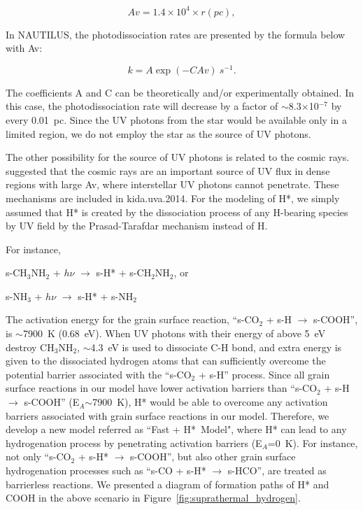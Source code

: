 \documentclass{aastex61}
\begin{document}
\begin{equation}
Av=1.4 \times 10^{4} \times r (pc),
\end{equation}


In NAUTILUS, the photodissociation rates are presented by the formula below with Av:

\begin{equation}
k = A\exp(-C Av)~s^{-1}.
\end{equation}

The coefficients A and C can be theoretically and/or experimentally obtained.
%
In this case, the photodissociation rate will decrease by a factor of $\sim$8.3$\times$10$^{-7}$ by every 0.01~pc.
%
Since the UV photons from the star would be available only in a limited region, we do not employ the star as the source of UV photons. 


The other possibility for the source of UV photons is related to the cosmic rays. 
%
\cite{Prasad83} suggested that the cosmic rays are an important source of UV flux in dense regions with large Av, where interstellar UV photons cannot penetrate.
%
These mechanisms are included in kida.uva.2014.
%
For the modeling of H*, we simply assumed that H* is created by the dissociation process of any H-bearing species by UV field by the Prasad-Tarafdar mechanism instead of H.
%



For instance,

s-CH$_3$NH$_2$ + $h\nu$ $\longrightarrow$ s-H* + s-CH$_2$NH$_2$, or

s-NH$_3$ + $h\nu$ $\longrightarrow$ s-H* + s-NH$_2$

%
The activation energy for the grain surface reaction, ``s-CO$_2$ + s-H $\longrightarrow$ s-COOH'', is $\sim$7900~K (0.68~eV).
%
When UV photons with their energy of above 5~eV destroy CH$_3$NH$_2$, $\sim$4.3~eV is used to dissociate C-H bond, and extra energy is given to the dissociated hydrogen atoms that can sufficiently overcome the potential barrier associated with the ``s-CO$_2$ + s-H'' process.
%
Since all grain surface reactions in our model have lower activation barriers than ``s-CO$_2$ + s-H $\longrightarrow$ s-COOH'' (E$_A$$\sim$7900~K), H* would be able to overcome any activation barriers associated with grain surface reactions in our model.  
%
Therefore, we develop a new model referred as ``Fast + H*~Model", where H* can lead to any hydrogenation process by penetrating activation barriers  (E$_A$=0~K).
%
For instance, not only ``s-CO$_2$ + s-H* $\longrightarrow$ s-COOH'', but also other grain surface hydrogenation  processes such as ``s-CO + s-H* $\longrightarrow$ s-HCO'', are treated as barrierless reactions.
%
We presented a diagram of formation paths of H* and COOH in the above scenario in Figure~\ref{fig:suprathermal_hydrogen}.
\end{document}
